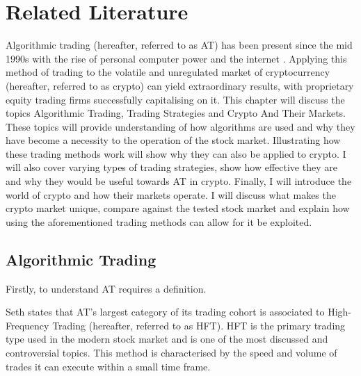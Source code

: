 %
\chapter{Related Literature}
\label{sec:related}
Algorithmic trading (hereafter, referred to as AT) has been present since the mid 1990s with the rise of personal computer power and the internet \cite{WEB:PISANI:2010}. Applying this method of trading to the volatile and unregulated market of cryptocurrency (hereafter, referred to as crypto) can yield extraordinary results, with proprietary equity trading firms successfully capitalising on it. This chapter will discuss the topics Algorithmic Trading, Trading Strategies and Crypto And Their Markets. These topics will provide understanding of how algorithms are used and why they have become a necessity to the operation of the stock market. Illustrating how these trading methods work will show why they can also be applied to crypto. I will also cover varying types of trading strategies, show how effective they are and why they would be useful towards AT in crypto. Finally, I will introduce the world of crypto and how their markets operate. I will discuss what makes the crypto market unique, compare against the tested stock market and explain how using the aforementioned trading methods can allow for it be exploited. 


\section{Algorithmic Trading}
\label{sec:related:algoTrading}
\noindent Firstly, to understand AT requires a definition.

\noindent Seth \cite{WEB:SETH:0001} states that AT's largest category of its trading cohort is associated to High-Frequency Trading (hereafter, referred to as HFT). HFT is the primary trading type used in the modern stock market and is one of the most discussed and controversial topics. This method is characterised by the speed and volume of trades it can execute within a small time frame.

